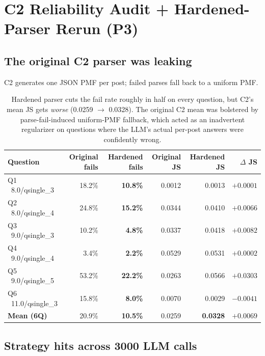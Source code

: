\documentclass[10pt,a4paper]{article}
\newcommand{\good}[1]{\textcolor{green!50!black}{\textbf{#1}}}
\newcommand{\bad}[1]{\textcolor{red!60!black}{#1}}
\begin{document}
\section{C2 Reliability Audit + Hardened-Parser Rerun (P3)}

\subsection{The original C2 parser was leaking}

C2 generates one JSON PMF per post; failed parses fall back to a uniform PMF.

\begin{table}[H]
\centering
\small
\begin{tabular}{l r r r r r}
\toprule
\textbf{Question} & \textbf{Original fails} & \textbf{Hardened fails} & \textbf{Original JS} & \textbf{Hardened JS} & \textbf{$\Delta$ JS} \\
\midrule
Q1 \ 8.0/qsingle\_3   & 18.2\% & \good{10.8\%} & 0.0012 & 0.0013 & $+0.0001$ \\
Q2 \ 8.0/qsingle\_4   & 24.8\% & \good{15.2\%} & 0.0344 & 0.0410 & \bad{$+0.0066$} \\
Q3 \ 9.0/qsingle\_3   & 10.2\% & \good{4.8\%}  & 0.0337 & 0.0418 & \bad{$+0.0082$} \\
Q4 \ 9.0/qsingle\_4   & 3.4\%  & \good{2.2\%}  & 0.0529 & 0.0531 & $+0.0002$ \\
\rowcolor{badrow}
Q5 \ 9.0/qsingle\_5   & \bad{53.2\%} & \good{22.2\%} & 0.0263 & 0.0566 & \bad{$+0.0303$} \\
Q6 \ 11.0/qsingle\_3  & 15.8\% & \good{8.0\%}  & 0.0070 & 0.0029 & \good{$-0.0041$} \\
\midrule
\textbf{Mean (6Q)}    & 20.9\% & \good{10.5\%} & 0.0259 & \bad{\textbf{0.0328}} & \bad{\textbf{$+0.0069$}} \\
\bottomrule
\end{tabular}
\caption{Hardened parser cuts the fail rate roughly in half on every question, but C2's mean JS gets \emph{worse} (0.0259 $\to$ 0.0328). The original C2 mean was bolstered by parse-fail-induced uniform-PMF fallback, which acted as an inadvertent regularizer on questions where the LLM's actual per-post answers were confidently wrong.}
\end{table}

\subsection{Strategy hits across 3000 LLM calls}
\end{document}

